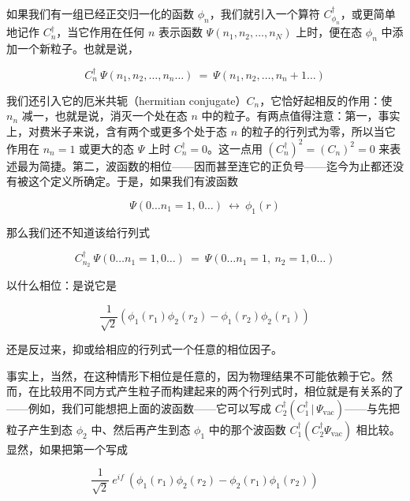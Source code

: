 如果我们有一组已经正交归一化的函数 $\phi_n$，我们就引入一个算符 $C_{\phi_n}^{\dagger}$，或更简单地记作 $C_n^{\dagger}$，当它作用在任何 $n$ 表示函数 $\Psi(n_1,n_2,\ldots,n_N)$ 上时，便在态 $\phi_n$ 中添加一个新粒子。也就是说，

\begin{equation*}
C_n^{\dagger}\ \Psi(n_1,n_2,\ldots,n_n\ldots)\ =\ \Psi(n_1,n_2,\ldots,n_n+1\ldots)
\end{equation*}

我们还引入它的厄米共轭（hermitian conjugate）$C_n$，它恰好起相反的作用：使 $n_n$ 减一，也就是说，消灭一个处在态 $n$ 中的粒子。有两点值得注意：第一，事实上，对费米子来说，含有两个或更多个处于态 $n$ 的粒子的行列式为零，所以当它作用在 $n_n=1$ 或更大的态 $\Psi$ 上时 $C_n^{\dagger}=0$。这一点用 $(C_n^{\dagger})^2=(C_n)^2=0$ 来表述最为简捷。第二，波函数的相位——因而甚至连它的正负号——迄今为止都还没有被这个定义所确定。于是，如果我们有波函数

\begin{equation*}
\Psi(0\ldots n_1=1,\,0\ldots)\ \longleftrightarrow\ \phi_1(r)
\end{equation*}

那么我们还不知道该给行列式

\begin{equation*}
C_{n_2}^{\dagger}\ \Psi(0\ldots n_1=1,0\ldots)\ =\ \Psi(0\ldots n_1=1,\ n_2=1,0\ldots)
\end{equation*}

以什么相位：是说它是

\begin{equation*}
\frac{1}{\sqrt{2}}\left(\phi_1(r_1)\phi_2(r_2)-\phi_1(r_2)\phi_2(r_1)\right)
\end{equation*}

还是反过来，抑或给相应的行列式一个任意的相位因子。

事实上，当然，在这种情形下相位是任意的，因为物理结果不可能依赖于它。然而，在比较用不同方式产生粒子而构建起来的两个行列式时，相位就是有关系的了——例如，我们可能想把上面的波函数——它可以写成 $C_2^{\dagger}(C_1^{\dagger}\,|\,\Psi_{\mathrm{vac}})$——与先把粒子产生到态 $\phi_2$ 中、然后再产生到态 $\phi_1$ 中的那个波函数 $C_1^{\dagger}(C_2^{\dagger}\Psi_{\mathrm{vac}})$ 相比较。显然，如果把第一个写成

\begin{equation*}
\frac{1}{\sqrt{2}}\ e^{if}\ \left(\phi_1(r_1)\phi_2(r_2)-\phi_2(r_1)\phi_1(r_2)\right)
\end{equation*}

